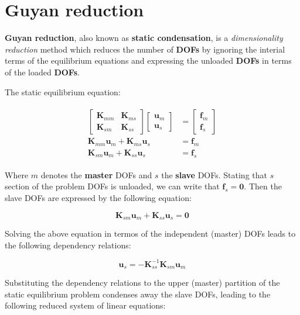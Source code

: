 \documentclass[10pt,b5paper,titlepage]{book}
\newenvironment{eqarray}
{
    \begin{eqnarray}
        \begin{aligned}
}
{
        \end{aligned}
    \end{eqnarray}
}
\begin{document}
\section{Guyan reduction}
\textbf{Guyan reduction}, also known as \textbf{static condensation},
is a \textit{dimensionality reduction} method which reduces the number
of \textbf{DOFs} by ignoring the interial terms of the equilibrium equations
and expressing the unloaded \textbf{DOFs} in terms of the loaded \textbf{DOFs}.

The static equilibrium equation:

\begin{eqarray}
    \begin{bmatrix}
        \mathbf{K}_{mm} & \mathbf{K}_{ms} \\
        \mathbf{K}_{sm} & \mathbf{K}_{ss}
    \end{bmatrix}
    \begin{bmatrix}
        \mathbf{u}_m \\
        \mathbf{u}_s
    \end{bmatrix} &=
    \begin{bmatrix}
        \mathbf{f}_m \\
        \mathbf{f}_s
    \end{bmatrix} \\
    \mathbf{K}_{mm} \mathbf{u}_m + \mathbf{K}_{ms} \mathbf{u}_s &= \mathbf{f}_m \\
    \mathbf{K}_{sm} \mathbf{u}_m + \mathbf{K}_{ss} \mathbf{u}_s &= \mathbf{f}_s
\end{eqarray}

Where $ m $ denotes the \textbf{master} DOFs and $ s $ the \textbf{slave} DOFs.
Stating that $ s $ section of the problem DOFs is unloaded, we can
write that $ \mathbf{f}_s = \mathbf{0} $. Then the slave DOFs are expressed
by the following equation:

\begin{equation}
    \mathbf{K}_{sm} \mathbf{u}_m + \mathbf{K}_{ss} \mathbf{u}_s = \mathbf{0}
\end{equation}

Solving the above equation in termos of the independent (master) DOFs leads to
the following dependency relations:

\begin{equation}
    \mathbf{u}_s = -\mathbf{K}_{ss}^{-1} \mathbf{K}_{sm} \mathbf{u}_m
\end{equation}

Substituting the dependency relations to the upper (master) partition of the static
equilibrium problem condenses away the slave DOFs, leading to the following reduced
system of linear equations:
\end{document}
